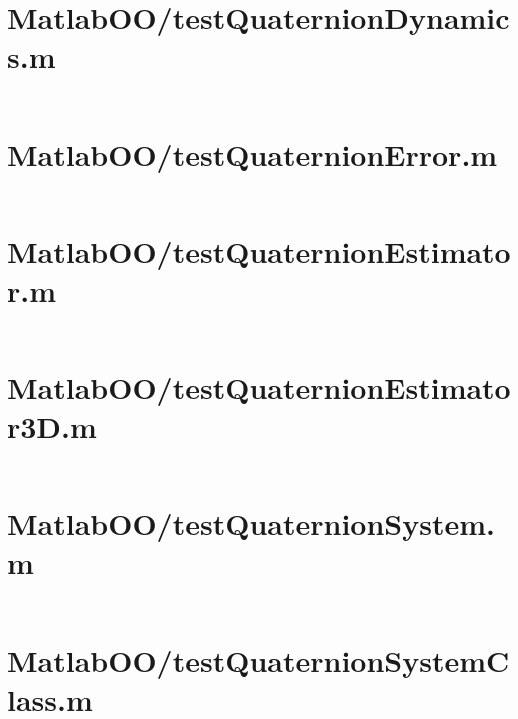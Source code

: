 \pagebreak
\section{MatlabOO/testQuaternionDynamics.m}\label{code:MatlabOO/testQuaternionDynamics.m}
\inputminted[linenos,fontsize=\scriptsize]{matlab}{/home/dcouture/git/mathyourlife/TSatPy/beta_versions/matlab_object_oriented/testQuaternionDynamics.m}

\pagebreak
\section{MatlabOO/testQuaternionError.m}\label{code:MatlabOO/testQuaternionError.m}
\inputminted[linenos,fontsize=\scriptsize]{matlab}{/home/dcouture/git/mathyourlife/TSatPy/beta_versions/matlab_object_oriented/testQuaternionError.m}

\pagebreak
\section{MatlabOO/testQuaternionEstimator.m}\label{code:MatlabOO/testQuaternionEstimator.m}
\inputminted[linenos,fontsize=\scriptsize]{matlab}{/home/dcouture/git/mathyourlife/TSatPy/beta_versions/matlab_object_oriented/testQuaternionEstimator.m}

\pagebreak
\section{MatlabOO/testQuaternionEstimator3D.m}\label{code:MatlabOO/testQuaternionEstimator3D.m}
\inputminted[linenos,fontsize=\scriptsize]{matlab}{/home/dcouture/git/mathyourlife/TSatPy/beta_versions/matlab_object_oriented/testQuaternionEstimator3D.m}

\pagebreak
\section{MatlabOO/testQuaternionSystem.m}\label{code:MatlabOO/testQuaternionSystem.m}
\inputminted[linenos,fontsize=\scriptsize]{matlab}{/home/dcouture/git/mathyourlife/TSatPy/beta_versions/matlab_object_oriented/testQuaternionSystem.m}

\pagebreak
\section{MatlabOO/testQuaternionSystemClass.m}\label{code:MatlabOO/testQuaternionSystemClass.m}
\inputminted[linenos,fontsize=\scriptsize]{matlab}{/home/dcouture/git/mathyourlife/TSatPy/beta_versions/matlab_object_oriented/testQuaternionSystemClass.m}

